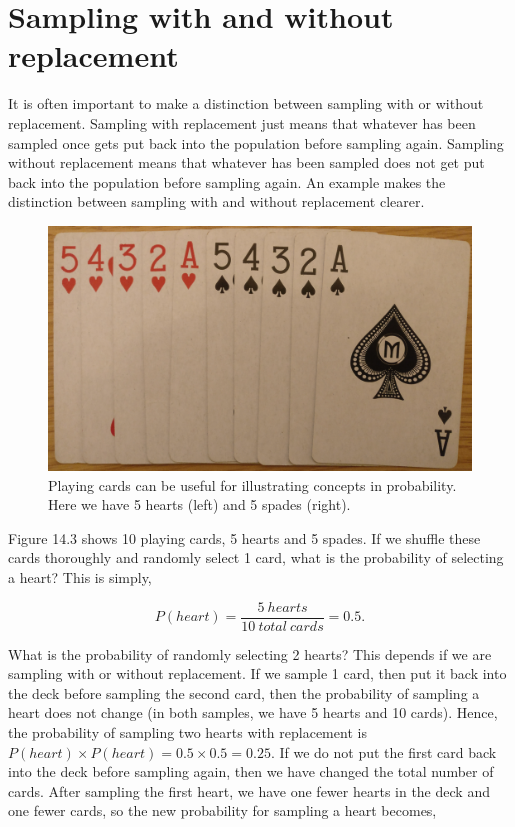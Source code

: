 \documentclass[
]{scrbook}
\begin{document}
\hypertarget{sampling-with-and-without-replacement}{%
\section{Sampling with and without replacement}\label{sampling-with-and-without-replacement}}

It is often important to make a distinction between sampling with or without replacement.
Sampling with replacement just means that whatever has been sampled once gets put back into the population before sampling again.
Sampling without replacement means that whatever has been sampled does not get put back into the population before sampling again.
An example makes the distinction between sampling with and without replacement clearer.

\begin{figure}
\includegraphics[width=1\linewidth]{img/cards} \caption{Playing cards can be useful for illustrating concepts in probability. Here we have 5 hearts (left) and 5 spades (right).}\label{fig:unnamed-chunk-55}
\end{figure}

Figure 14.3 shows 10 playing cards, 5 hearts and 5 spades.
If we shuffle these cards thoroughly and randomly select 1 card, what is the probability of selecting a heart?
This is simply,

\[P(heart) = \frac{5\:hearts}{10\:total\:cards} = 0.5.\]

What is the probability of randomly selecting 2 hearts?
This depends if we are sampling with or without replacement.
If we sample 1 card, then put it back into the deck before sampling the second card, then the probability of sampling a heart does not change (in both samples, we have 5 hearts and 10 cards).
Hence, the probability of sampling two hearts with replacement is \(P(heart) \times P(heart) = 0.5 \times 0.5 = 0.25\).
If we do not put the first card back into the deck before sampling again, then we have changed the total number of cards.
After sampling the first heart, we have one fewer hearts in the deck and one fewer cards, so the new probability for sampling a heart becomes,
\end{document}
